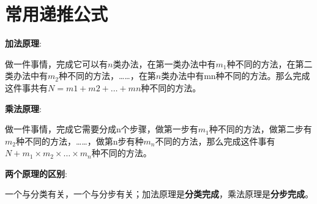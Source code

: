 \documentclass{article}
\begin{document}
\section{常用递推公式}

\textbf{加法原理}:

做一件事情，完成它可以有$n$类办法，在第一类办法中有$m_1$种不同的方法，在第二类办法中有$m_2$种不同的方法，……，在第$n$类办法中有mn种不同的方法。那么完成这件事共有$N=m1+m2+…+mn$种不同的方法。

\textbf{乘法原理}:

做一件事情，完成它需要分成n个步骤，做第一步有$m_1$种不同的方法，做第二步有$m_2$种不同的方法，……，做第n步有种$m_n$不同的方法，那么完成这件事有$N+m_1 
\times m_2 \times … \times m_n$种不同的方法。

\textbf{两个原理的区别}:

一个与分类有关，一个与分步有关；加法原理是\textbf{分类完成}，乘法原理是\textbf{分步完成}。
\end{document}
